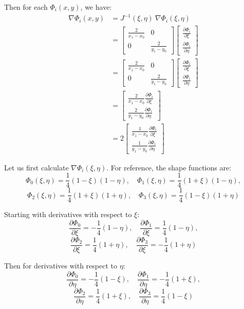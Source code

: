 \documentclass[12pt]{article}
\begin{document}
Then for each $\Phi_i(x,y)$, we have:
\begin{align*}
    \nabla \Phi_i(x,y) &= J^{-1}(\xi,\eta) \ \nabla \Phi_i(\xi,\eta) \\
    &= \begin{bmatrix}
\frac{2}{x_1 - x_0} & 0 \\ 
0 & \frac{2}{y_1 - y_0}
\end{bmatrix} \begin{bmatrix}
\frac{\partial \Phi_i}{\partial \xi} \\ \frac{\partial \Phi_i}{\partial \eta}
\end{bmatrix} \\
&= \begin{bmatrix}
\frac{2}{x_1 - x_0} & 0 \\ 
0 & \frac{2}{y_1 - y_0}
\end{bmatrix} \begin{bmatrix}
\frac{\partial \Phi_i}{\partial \xi} \\ \frac{\partial \Phi_i}{\partial \eta}
\end{bmatrix} \\
&= \begin{bmatrix}
\frac{2}{x_1 - x_0} \frac{\partial \Phi_i}{\partial \xi} \\ \frac{2}{y_1 - y_0} \frac{\partial \Phi_i}{\partial \eta}
\end{bmatrix} \\
&= 2 \begin{bmatrix} \frac{1}{x_1 - x_0} \frac{\partial \Phi_i}{\partial \xi} \\ \frac{1}{y_1 - y_0} \frac{\partial \Phi_i}{\partial \eta} \end{bmatrix}
\end{align*}

Let us first calculate $\nabla \Phi_i(\xi,\eta)$. For reference, the shape functions are:
\[\Phi_0(\xi,\eta) = \frac{1}{4}(1-\xi)(1-\eta), \quad \Phi_1(\xi,\eta) = \frac{1}{4}(1+\xi)(1-\eta),\]
\[\Phi_2(\xi,\eta) = \frac{1}{4}(1+\xi)(1+\eta), \quad \Phi_3(\xi,\eta) = \frac{1}{4}(1-\xi)(1+\eta)\]

Starting with derivatives with respect to $\xi$:
\[\frac{\partial \Phi_0}{\partial \xi} = -\frac{1}{4}(1-\eta), \quad \frac{\partial \Phi_1}{\partial \xi} = \frac{1}{4}(1-\eta),\]
\[\frac{\partial \Phi_2}{\partial \xi} = \frac{1}{4}(1+\eta), \quad \frac{\partial \Phi_3}{\partial \xi} = -\frac{1}{4}(1+\eta)\]

Then for derivatives with respect to $\eta$:
\[\frac{\partial \Phi_0}{\partial \eta} = -\frac{1}{4}(1-\xi), \quad \frac{\partial \Phi_1}{\partial \eta} = -\frac{1}{4}(1+\xi),\]
\[\frac{\partial \Phi_2}{\partial \eta} = \frac{1}{4}(1+\xi), \quad \frac{\partial \Phi_3}{\partial \eta} = \frac{1}{4}(1-\xi)\]
\end{document}
